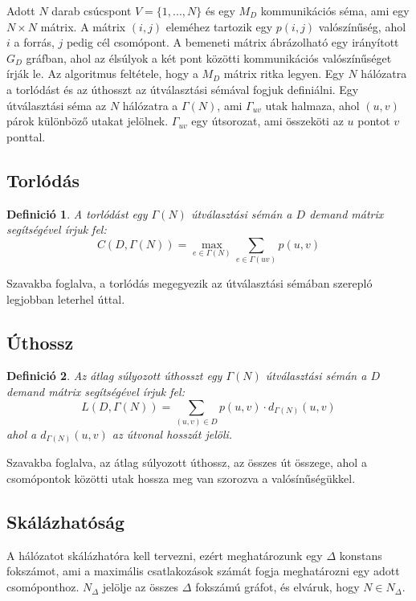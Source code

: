 \documentclass[12pt]{report}
\newtheorem{mydef}{Definició}
\begin{document}
Adott $N$ darab csúcspont  $V = \{1, ..., N\}$  és egy $M_D$ kommunikációs séma, ami egy $N\times N$ mátrix.
A mátrix $(i, j)$ eleméhez tartozik egy $p(i, j)$ valószínűség, ahol $i$ a forrás, $j$ pedig cél csomópont.
A bemeneti mátrix ábrázolható egy irányított $G_D$ gráfban, ahol az élsúlyok a két pont közötti kommunikációs valószínűséget írják le.
Az algoritmus feltétele, hogy a \(M_D\) mátrix ritka legyen.
Egy $N$ hálózatra a torlódást és az úthosszt az útválasztási sémával fogjuk definiálni.
Egy útválasztási séma az $N$ hálózatra a $\Gamma(N)$, ami $\Gamma_{uv}$ utak halmaza, ahol $(u, v)$ párok különböző utakat jelölnek.
$\Gamma_{uv}$ egy útsorozat, ami összeköti az $u$ pontot $v$ ponttal.

\subsection{Torlódás}

\begin{mydef}
	A torlódást egy \(\Gamma(N)\) útválasztási sémán a \(D\) demand mátrix segítségével írjuk fel: \[C(D, \Gamma(N)) = \max_{e \in \Gamma(N)}  \sum_{e \in \Gamma(uv)} p(u,v) \]
\end{mydef}

Szavakba foglalva, a torlódás megegyezik az útválasztási sémában szerepló legjobban leterhel úttal.

\subsection{Úthossz}

\begin{mydef}
	Az átlag súlyozott úthosszt egy \(\Gamma(N)\) útválasztási sémán a \(D\) demand mátrix segítségével írjuk fel: \[L(D, \Gamma(N)) = \sum_{(u,v) \in D}  p(u,v)  \cdot d_{\Gamma(N)}(u, v) \] ahol a \(d_{\Gamma(N)}(u, v)\) az útvonal hosszát jelöli.
\end{mydef}

Szavakba foglalva, az átlag súlyozott úthossz, az összes út összege, ahol a csomópontok közötti utak hossza meg van szorozva a valósínűségükkel. 

\subsection{Skálázhatóság}

A hálózatot skálázhatóra kell tervezni, ezért meghatározunk egy \(\Delta\) konstans fokszámot, ami a maximális csatlakozások számát fogja meghatározni egy adott csomóponthoz.
\(N_\Delta\) jelölje az összes \(\Delta\) fokszámú gráfot, és elváruk, hogy \(N \in N_\Delta\).
\end{document}
